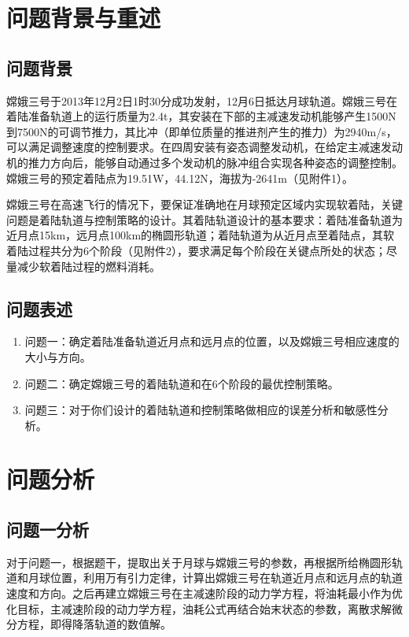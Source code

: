 \documentclass{ctexart}
\begin{document}
	\section{问题背景与重述}
	\subsection{问题背景}
    嫦娥三号于2013年12月2日1时30分成功发射，12月6日抵达月球轨道。嫦娥三号在着陆准备轨道上的运行质量为2.4t，其安装在下部的主减速发动机能够产生1500N到7500N的可调节推力，其比冲（即单位质量的推进剂产生的推力）为2940m/s，可以满足调整速度的控制要求。在四周安装有姿态调整发动机，在给定主减速发动机的推力方向后，能够自动通过多个发动机的脉冲组合实现各种姿态的调整控制。嫦娥三号的预定着陆点为19.51W，44.12N，海拔为-2641m（见附件1）。

嫦娥三号在高速飞行的情况下，要保证准确地在月球预定区域内实现软着陆，关键问题是着陆轨道与控制策略的设计。其着陆轨道设计的基本要求：着陆准备轨道为近月点15km，远月点100km的椭圆形轨道；着陆轨道为从近月点至着陆点，其软着陆过程共分为6个阶段（见附件2），要求满足每个阶段在关键点所处的状态；尽量减少软着陆过程的燃料消耗。
    \subsection{问题表述}
    \begin{enumerate}[(1)]
        \item 问题一：确定着陆准备轨道近月点和远月点的位置，以及嫦娥三号相应速度的大小与方向。
        \item 问题二：确定嫦娥三号的着陆轨道和在6个阶段的最优控制策略。
        \item 问题三：对于你们设计的着陆轨道和控制策略做相应的误差分析和敏感性分析。
    \end{enumerate}

    \section{问题分析}
    \subsection{问题一分析}
    对于问题一，根据题干，提取出关于月球与嫦娥三号的参数，再根据所给椭圆形轨道和月球位置，利用万有引力定律，计算出嫦娥三号在轨道近月点和远月点的轨道速度和方向。之后再建立嫦娥三号在主减速阶段的动力学方程，将油耗最小作为优化目标，主减速阶段的动力学方程，油耗公式再结合始末状态的参数，离散求解微分方程，即得降落轨道的数值解。
\end{document}
